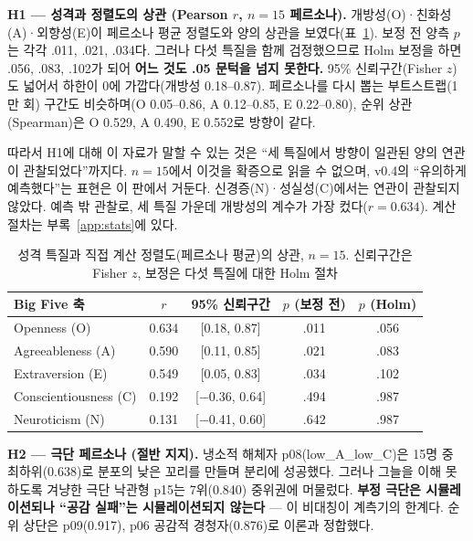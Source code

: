 \documentclass[11pt, a4paper]{article}
\begin{document}
\textbf{H1 --- 성격과 정렬도의 상관 (Pearson $r$, $n=15$ 페르소나).} 개방성(O)·친화성(A)·외향성(E)이 페르소나 평균 정렬도와 양의 상관을 보였다(표~\ref{tab:corr}). 보정 전 양측 $p$는 각각 .011, .021, .034다. 그러나 다섯 특질을 함께 검정했으므로 Holm 보정을 하면 .056, .083, .102가 되어 \textbf{어느 것도 .05 문턱을 넘지 못한다.} 95\% 신뢰구간(Fisher $z$)도 넓어서 하한이 0에 가깝다(개방성 0.18--0.87). 페르소나를 다시 뽑는 부트스트랩(1만 회) 구간도 비슷하며(O 0.05--0.86, A 0.12--0.85, E 0.22--0.80), 순위 상관(Spearman)은 O 0.529, A 0.490, E 0.552로 방향이 같다.

따라서 H1에 대해 이 자료가 말할 수 있는 것은 ``세 특질에서 방향이 일관된 양의 연관이 관찰되었다''까지다. $n=15$에서 이것을 확증으로 읽을 수 없으며, v0.4의 ``유의하게 예측했다''는 표현은 이 판에서 거둔다. 신경증(N)·성실성(C)에서는 연관이 관찰되지 않았다. 예측 밖 관찰로, 세 특질 가운데 개방성의 계수가 가장 컸다($r=0.634$). 계산 절차는 부록~\ref{app:stats}에 있다.

\begin{table}[H]
\centering
\caption{성격 특질과 직접 계산 정렬도(페르소나 평균)의 상관, $n=15$. 신뢰구간은 Fisher $z$, 보정은 다섯 특질에 대한 Holm 절차}
\label{tab:corr}
\small
\begin{tabular}{l c c c c}
\toprule
\textbf{Big Five 축} & \textbf{$r$} & \textbf{95\% 신뢰구간} & \textbf{$p$ (보정 전)} & \textbf{$p$ (Holm)} \\
\midrule
Openness (O) & 0.634 & [0.18, 0.87] & .011 & .056 \\
Agreeableness (A) & 0.590 & [0.11, 0.85] & .021 & .083 \\
Extraversion (E) & 0.549 & [0.05, 0.83] & .034 & .102 \\
Conscientiousness (C) & 0.192 & [$-$0.36, 0.64] & .494 & .987 \\
Neuroticism (N) & 0.131 & [$-$0.41, 0.60] & .642 & .987 \\
\bottomrule
\end{tabular}
\end{table}

\textbf{H2 --- 극단 페르소나 (절반 지지).} 냉소적 해체자 p08(low\_A\_low\_C)은 15명 중 최하위(0.638)로 분포의 낮은 꼬리를 만들며 분리에 성공했다. 그러나 그늘을 이해 못 하도록 겨냥한 극단 낙관형 p15는 7위(0.840) 중위권에 머물렀다. \textbf{부정 극단은 시뮬레이션되나 ``공감 실패''는 시뮬레이션되지 않는다} --- 이 비대칭이 계측기의 한계다. 순위 상단은 p09(0.917), p06 공감적 경청자(0.876)로 이론과 정합했다.
\end{document}
